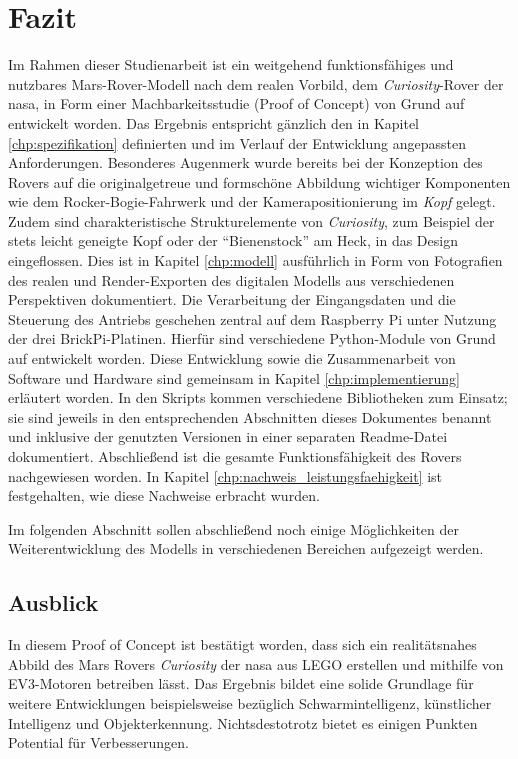 \chapter{Fazit}
\label{chp:fazit}

Im Rahmen dieser Studienarbeit ist ein weitgehend funktionsfähiges und nutzbares Mars-Rover-Modell nach dem realen Vorbild, dem \textit{Curiosity}-Rover der \acs{nasa}, in Form einer Machbarkeitsstudie (Proof of Concept) von Grund auf entwickelt worden.
Das Ergebnis entspricht gänzlich den in Kapitel \ref{chp:spezifikation} definierten und im Verlauf der Entwicklung angepassten Anforderungen.
Besonderes Augenmerk wurde bereits bei der Konzeption des Rovers auf die originalgetreue und formschöne Abbildung wichtiger Komponenten wie dem Rocker-Bogie-Fahrwerk und der Kamerapositionierung im \textit{Kopf} gelegt.
Zudem sind charakteristische Strukturelemente von \textit{Curiosity}, zum Beispiel der stets leicht geneigte Kopf oder der \enquote{Bienenstock} am Heck, in das Design eingeflossen.
Dies ist in Kapitel \ref{chp:modell} ausführlich in Form von Fotografien des realen und Render-Exporten des digitalen Modells aus verschiedenen Perspektiven dokumentiert.
Die Verarbeitung der Eingangsdaten und die Steuerung des Antriebs geschehen zentral auf dem Raspberry Pi unter Nutzung der drei BrickPi-Platinen.
Hierfür sind verschiedene Python-Module von Grund auf entwickelt worden.
Diese Entwicklung sowie die Zusammenarbeit von Software und Hardware sind gemeinsam in Kapitel \ref{chp:implementierung} erläutert worden.
In den Skripts kommen verschiedene Bibliotheken zum Einsatz; sie sind jeweils in den entsprechenden Abschnitten dieses Dokumentes benannt und inklusive der genutzten Versionen in einer separaten Readme-Datei dokumentiert.
Abschließend ist die gesamte Funktionsfähigkeit des Rovers nachgewiesen worden.
In Kapitel \ref{chp:nachweis_leistungsfaehigkeit} ist festgehalten, wie diese Nachweise erbracht wurden.

Im folgenden Abschnitt sollen abschließend noch einige Möglichkeiten der Weiterentwicklung des Modells in verschiedenen Bereichen aufgezeigt werden.

\section{Ausblick}
\label{sec:ausblick}

In diesem Proof of Concept ist bestätigt worden, dass sich ein realitätsnahes Abbild des Mars Rovers \textit{Curiosity} der \acs{nasa} aus LEGO erstellen und mithilfe von EV3-Motoren betreiben lässt.
Das Ergebnis bildet eine solide Grundlage für weitere Entwicklungen beispielsweise bezüglich Schwarmintelligenz, künstlicher Intelligenz und Objekterkennung.
Nichtsdestotrotz bietet es einigen Punkten Potential für Verbesserungen.

